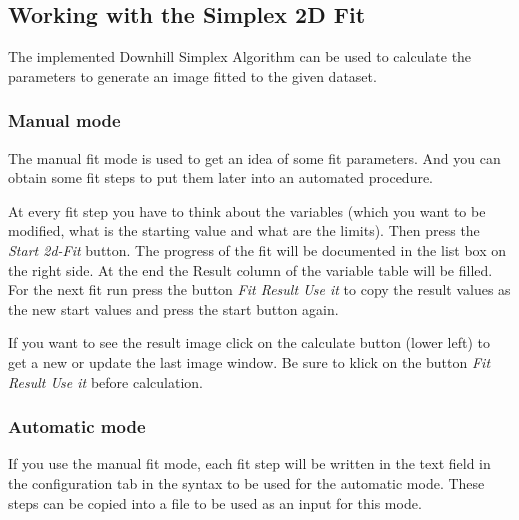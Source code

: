 \documentclass[11pt]{article} %
\begin{document}
\subsection{Working with the Simplex 2D Fit}

The implemented Downhill Simplex Algorithm can be used to calculate the parameters to generate an image fitted to the given dataset.

\subsubsection{Manual mode}

The manual fit mode is used to get an idea of some fit parameters. And you can obtain some fit steps to put them later into an automated procedure.

At every fit step you have to think about the variables (which you want to be modified, what is the starting value and what are the limits). Then press the {\it Start 2d-Fit} button. The progress of the fit will be documented in the list box on the right side. At the end the Result column of the variable table will be filled. For the next fit run press the button {\it Fit Result Use it} to copy the result values as the new start values and press the start button again.

If you want to see the result image click on the calculate button (lower left) to get a new or update the last image window. Be sure to klick on the button {\it Fit Result Use it} before calculation.

\subsubsection{Automatic mode}

If you use the manual fit mode, each fit step will be written in the text field in the configuration tab in the syntax to be used for the automatic mode. These steps can be copied into a file to be used as an input for this mode.
\end{document}
